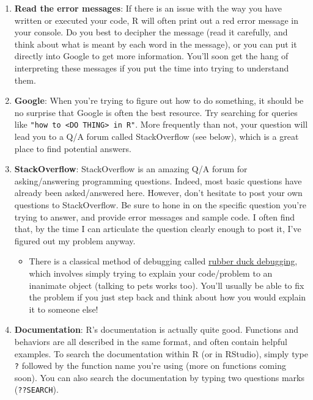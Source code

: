 \documentclass[]{book}
\providecommand{\tightlist}{%
  \setlength{\itemsep}{0pt}\setlength{\parskip}{0pt}}
\theoremstyle{definition}
\theoremstyle{definition}
\theoremstyle{remark}
\begin{document}
\begin{enumerate}
\def\labelenumi{\arabic{enumi}.}
\item
  \textbf{Read the error messages}: If there is an issue with the way
  you have written or executed your code, R will often print out a red
  error message in your console. Do you best to decipher the message
  (read it carefully, and think about what is meant by each word in the
  message), or you can put it directly into Google to get more
  information. You'll soon get the hang of interpreting these messages
  if you put the time into trying to understand them.
\item
  \textbf{Google}: When you're trying to figure out how to do something,
  it should be no surprise that Google is often the best resource. Try
  searching for queries like
  \texttt{"how\ to\ \textless{}DO\ THING\textgreater{}\ in\ R"}. More
  frequently than not, your question will lead you to a Q/A forum called
  StackOverflow (see below), which is a great place to find potential
  answers.
\item
  \textbf{StackOverflow}: StackOverflow is an amazing Q/A forum for
  asking/answering programming questions. Indeed, most basic questions
  have already been asked/answered here. However, don't hesitate to post
  your own questions to StackOverflow. Be sure to hone in on the
  specific question you're trying to answer, and provide error messages
  and sample code. I often find that, by the time I can articulate the
  question clearly enough to post it, I've figured out my problem
  anyway.

  \begin{itemize}
  \tightlist
  \item
    There is a classical method of debugging called
    \href{https://en.wikipedia.org/wiki/Rubber_duck_debugging}{rubber
    duck debugging}, which involves simply trying to explain your
    code/problem to an inanimate object (talking to pets works too).
    You'll usually be able to fix the problem if you just step back and
    think about how you would explain it to someone else!
  \end{itemize}
\item
  \textbf{Documentation}: R's documentation is actually quite good.
  Functions and behaviors are all described in the same format, and
  often contain helpful examples. To search the documentation within R
  (or in RStudio), simply type \texttt{?} followed by the function name
  you're using (more on functions coming soon). You can also search the
  documentation by typing two questions marks (\texttt{??SEARCH}).


\end{enumerate}
\end{document}
